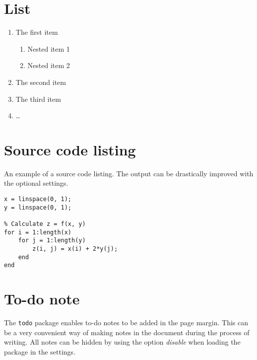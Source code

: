 \section{List}
\begin{enumerate}
	\item The first item
	      \begin{enumerate}
		      \item Nested item 1
		      \item Nested item 2
	      \end{enumerate}
	\item The second item
	\item The third item
	\item \dots
\end{enumerate}

\section{Source code listing}
An example of a source code listing. The output can be drastically improved
with the optional settings. \lstset{language=Matlab}
\begin{lstlisting}[frame=single]
% Generate x- and y-nodes
x = linspace(0, 1);
y = linspace(0, 1);

% Calculate z = f(x, y)
for i = 1:length(x)
    for j = 1:length(y)
        z(i, j) = x(i) + 2*y(j);
    end
end
\end{lstlisting}

\section{To-do note}
The \texttt{todo} package enables to-do notes to be added in the page margin.
This can be a very convenient way of making notes in the document during the
process of writing. All notes can be hidden by using the option \emph{disable}
when loading the package in the settings. 